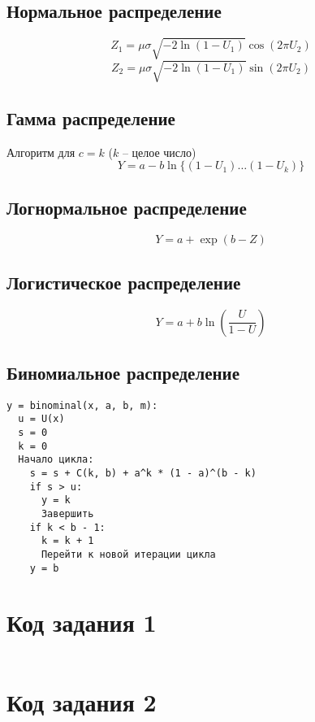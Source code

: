 \documentclass[bachelor, och, labwork]{SCWorks}
\begin{document}
\subsection{Нормальное распределение}
\[ Z_1 = \mu \sigma \sqrt{-2 \ln(1 - U_1)} \cos(2 \pi U_2) \]
\[ Z_2 = \mu \sigma \sqrt{-2 \ln(1 - U_1)} \sin(2 \pi U_2) \]

\subsection{Гамма распределение}
Алгоритм для $c = k$ ($k$ -- целое число)
\[ Y = a - b \ln \{(1 - U_1) \dots (1 - U_k)\} \]

\subsection{Логнормальное распределение}
\[ Y = a + \exp(b - Z) \]

\subsection{Логистическое распределение}
\[ Y = a + b \ln(\frac{U}{1 - U})\]

\subsection{Биномиальное распределение}

\begin{verbatim}
y = binominal(x, a, b, m):
  u = U(x)
  s = 0
  k = 0
  Начало цикла:
    s = s + C(k, b) + a^k * (1 - a)^(b - k)
    if s > u:
      y = k
      Завершить
    if k < b - 1:
      k = k + 1
      Перейти к новой итерации цикла
    y = b
\end{verbatim}
\newpage
\appendix
    \section{Код задания 1}
    \inputminted[fontsize=\footnotesize]{text}{../generator.cpp}

    \section{Код задания 2}
    \inputminted[fontsize=\footnotesize]{text}{../task2.py}
\end{document}
